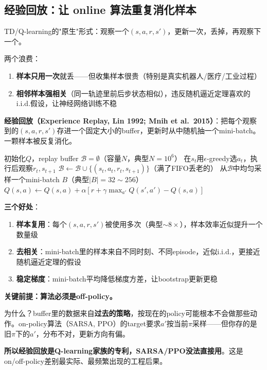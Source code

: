 \documentclass[11pt,a4paper]{article}
\theoremstyle{definition}
\begin{document}
\subsection{经验回放：让 online 算法重复消化样本}

\begin{plainwords}
TD/Q-learning的"原生"形式：观察一个$(s,a,r,s')$，更新一次，丢掉，再观察下一个。

两个浪费：
\begin{enumerate}
\item \textbf{样本只用一次}就丢——但收集样本很贵（特别是真实机器人/医疗/工业过程）
\item \textbf{相邻样本强相关}（同一轨迹里前后步状态相似），违反随机逼近定理喜欢的i.i.d.假设，让神经网络训练不稳
\end{enumerate}

\textbf{经验回放（Experience Replay, Lin 1992; Mnih et al.\ 2015）}：把每个观察到的$(s,a,r,s')$存进一个固定大小的buffer，更新时从中随机抽一个mini-batch。一颗样本被反复消化。
\end{plainwords}

\begin{algorithm}[H]
\caption{Q-learning with Experience Replay}
\begin{algorithmic}[1]
\State 初始化$Q$，replay buffer $\mathcal B = \emptyset$（容量$N$，典型$N=10^6$）
    \State 在$s_t$用$\epsilon$-greedy选$a_t$，执行后观察$r_t, s_{t+1}$
    \State $\mathcal B \leftarrow \mathcal B \cup \{(s_t, a_t, r_t, s_{t+1})\}$（满了FIFO丢老的）
    \State 从$\mathcal B$中均匀采样一个mini-batch $B$（典型$|B|=32\sim 256$）
        \State $Q(s,a) \leftarrow Q(s,a) + \alpha[r + \gamma\max_{a'} Q(s', a') - Q(s,a)]$
    \EndFor
\EndFor
\end{algorithmic}
\end{algorithm}

\begin{keypoint}
\textbf{三个好处}：
\begin{enumerate}
\item \textbf{样本复用}：每个$(s,a,r,s')$被使用多次（典型$\sim 8\times$），样本效率近似提升一个数量级
\item \textbf{去相关}：mini-batch里的样本来自不同时刻、不同episode，近似i.i.d.，更接近随机逼近定理的假设
\item \textbf{稳定梯度}：mini-batch平均降低梯度方差，让bootstrap更新更稳
\end{enumerate}

\textbf{关键前提：算法必须是off-policy。}

为什么？buffer里的数据来自\textbf{过去的策略}，按现在的policy可能根本不会做那些动作。on-policy算法（SARSA, PPO）的target要求$a'$按当前$\pi$采样——但你存的是旧$\pi$下的$a'$，分布不对，更新方向有偏。

\textbf{所以经验回放是Q-learning家族的专利，SARSA/PPO没法直接用}。这是on/off-policy差别最实际、最频繁出现的工程后果。
\end{keypoint}
\end{document}
